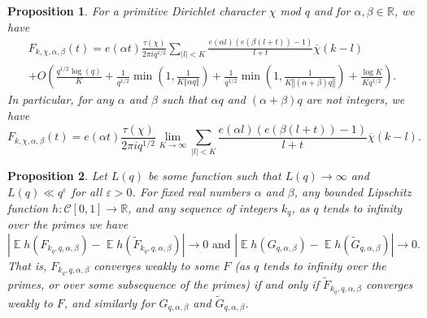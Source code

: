 \documentclass[10pt,a4paper]{amsart}
\newtheorem{proposition}{Proposition}
\DeclareMathOperator{\E}{\mathbb{E}}
\newcommand{\R}{\ensuremath{\mathbb{R}}}
\newcommand{\abs}[1]{\left|#1\right|}
\newcommand{\chibar}{\overline \chi}
\newcommand{\frcmod}[1]{\left\Vert#1\right\Vert}
\begin{document}
\begin{proposition}\label{prop:poisson}
    For a primitive Dirichlet character $\chi$ mod $q$ and for $\alpha,\beta \in \R$,
    we have
\begin{multline*}
    F_{k,\chi,\alpha,\beta}(t)
    = e(\alpha t)\frac{\tau(\chi)}{2\pi i q^{1/2}}\sum_{\abs{l} < K}
    \frac{e(\alpha l) (e(\beta(l + t)) - 1)}
    {l + t }
    \chibar(k-l)
    \\
    +
    O\left(\frac{q^{1/2} \log(q)}{K} + \frac{1}{q^{1/2}}\min\left(1, \frac{1}{K \frcmod{\alpha q}}\right)
        + \frac{1}{q^{1/2}}\min\left(1, \frac{1}{K\frcmod{(\alpha + \beta)q}}\right)
    + \frac{\log K}{Kq^{1/2}}
    \right).
\end{multline*}
    In particular, for any $\alpha$ and $\beta$ such that $\alpha q$ and
    $(\alpha + \beta)q$ are not integers, we have
    \begin{equation}\label{elegant_formula}
    F_{k,\chi,\alpha,\beta}(t) =
    e(\alpha t)\frac{\tau(\chi)}{2\pi i q^{1/2}}
    \lim_{K \rightarrow \infty}
    \sum_{\abs{l} < K}
    \frac{e(\alpha l) (e(\beta(l + t)) - 1)}
    {l + t }
    \chibar(k-l).
\end{equation}
\end{proposition}

\begin{proposition}\label{proposition:truncation}
    Let $L(q)$ be some function such that $L(q) \rightarrow \infty$ and
    $L(q) \ll q^\varepsilon$ for all $\varepsilon > 0$.
    For fixed real numbers $\alpha$ and $\beta$, any bounded Lipschitz function $h:\mathscr{C}[0,1] \rightarrow \R$, and
    any sequence of integers $k_q$, as $q$ tends to infinity over the primes we have 
    \[
        \abs{\E h(F_{k_q,q,\alpha,\beta}) - \E h(\tilde F_{k_q,q,\alpha,\beta})} \rightarrow 0 \text{ and } \abs{\E h(G_{q,\alpha,\beta}) - \E h(\tilde G_{q,\alpha,\beta})} \rightarrow 0.
    \]
    That is, $F_{k_q,q,\alpha,\beta}$ converges weakly to some $F$ (as $q$ tends
    to infinity over the primes, or over some subsequence of the primes) if and
    only if $\tilde F_{k_q,q,\alpha,\beta}$ converges weakly to $F$, and similarly for $G_{q, \alpha, \beta}$ and $\tilde G_{q, \alpha, \beta}$. 

\end{proposition}
\end{document}
